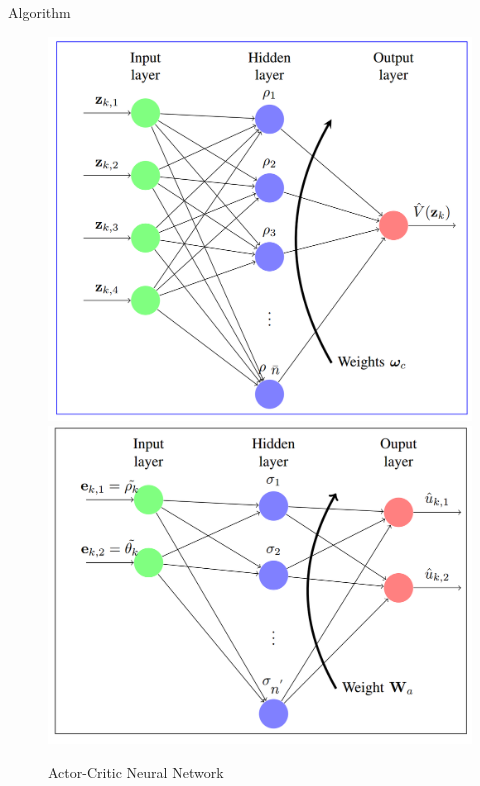 \documentclass{beamer}
\begin{document}
\begin{frame}{Algorithm}
\begin{figure}
\includegraphics[scale=0.12]{figs/img/critic.png}
\includegraphics[scale=0.12]{figs/img/actor.png}
\caption{Actor-Critic Neural Network}
\end{figure}
\end{frame}
\end{document}
